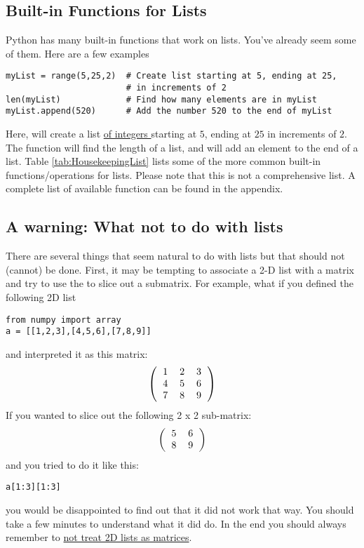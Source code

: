 \subsection*{Built-in Functions for Lists}
Python has many built-in functions that work on lists.  You've already
seem some of them.  Here are a few examples
\begin{Verbatim}
myList = range(5,25,2)  # Create list starting at 5, ending at 25,
                        # in increments of 2
len(myList)             # Find how many elements are in myList
myList.append(520)      # Add the number 520 to the end of myList
\end{Verbatim}
 Here,  will create a list \underline{of integers }
starting at $5$, ending at $25$ in increments of $2$.  The
 function will find the length of a list, and
 will add an element to the end of a list.  Table
\ref{tab:HousekeepingList} lists some of the more common built-in
functions/operations for lists.  Please note that this is not a
comprehensive list.  A complete list of available function can be
found in the appendix.


\subsection*{A warning: What not to do with lists}
There are several things that seem natural to do with lists but that
should not (cannot) be done.  First, it may be tempting to associate a
2-D list with a matrix and try to use the \code{:} to slice out a
submatrix.  For example, what if you defined the following 2D list
\begin{Verbatim}
from numpy import array
a = [[1,2,3],[4,5,6],[7,8,9]]
\end{Verbatim}
and interpreted it as this matrix:
\begin{equation}
\left( \begin{tabular}{ccc}
1 & 2 & 3\\
4 & 5 & 6\\
7 & 8 & 9\\
\end{tabular}
\right)
\end{equation}
If you wanted to slice out the following 2 x 2 sub-matrix:
\begin{equation}
\left(\begin{tabular}{cc}
5 & 6 \\
8 & 9 \\
\end{tabular}
\right)
\end{equation}
and you tried to do it like this:
\begin{Verbatim}
a[1:3][1:3] 
\end{Verbatim}
you would be disappointed to find out that it did not work that way.
You should take a few minutes to understand what it did do.  In the
end you should always remember to \ul{not treat 2D lists as matrices}.

